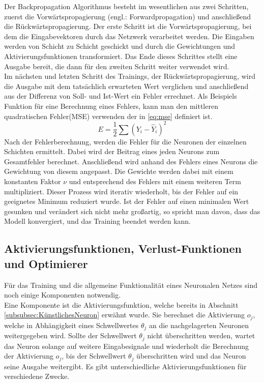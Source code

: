 Der Backpropagation Algorithmus besteht im wesentlichen aus zwei Schritten, zuerst die Vorwärtspropagierung (engl.: Forwardpropagation) und anschließend die Rückwärtspropagierung.
Der erste Schritt ist die Vorwärtspropagierung, bei dem die Eingabevektoren durch das Netzwerk verarbeitet werden. Die Eingaben werden von Schicht zu Schicht geschickt und durch die Gewichtungen und Aktivierungsfunktionen transformiert. Das Ende dieses Schrittes stellt eine Ausgabe bereit, die dann für den zweiten Schritt weiter verwendet wird. \\
Im nächsten und letzten Schritt des Trainings, der Rückwärtspropagierung, wird die Ausgabe mit dem tatsächlich erwarteten Wert verglichen und anschließend aus der Differenz von Soll- und Ist-Wert ein Fehler errechnet. Als Beispiels Funktion für eine Berechnung eines Fehlers, kann man den mittleren quadratischen Fehler(MSE) verwenden der in \ref{eq:mse} definiert ist.
\begin{equation}
	\label{eq:mse}
	E = \dfrac{1}{2} \sum (Y_i - \hat{Y}_{i})^2
\end{equation}
Nach der Fehlerberechnung, werden die Fehler für die Neuronen der einzelnen Schichten ermittelt. Dabei wird der Beitrag eines jeden Neurons zum Gesamtfehler berechnet. Anschließend wird anhand des Fehlers eines Neurons die Gewichtung von diesem angepasst. Die Gewichte werden dabei mit einem konstanten Faktor $\nu$ und entsprechend des Fehlers mit einem weiteren Term multipliziert. Dieser Prozess wird iterativ wiederholt, bis der Fehler auf ein geeignetes Minimum reduziert wurde. Ist der Fehler auf einen minimalen Wert gesunken und verändert sich nicht mehr großartig, so spricht man davon, dass das \gls{Modell} konvergiert, und das Training beendet werden kann.\cite[vgl.][]{Scherer1997}



\subsection{Aktivierungsfunktionen, Verlust-Funktionen und Optimierer}
\label{subsec:AktivierungsfunktionenVerlust-FunktionenOptimierer}
Für das Training und die allgemeine Funktionalität eines Neuronalen Netzes sind noch einige Komponenten notwendig.\\
Eine Komponente ist die Aktivierungsfunktion, welche bereits in Abschnitt \ref{subsubsec:KünstlichesNeuron} erwähnt wurde. Sie berechnet die Aktivierung $o_j$, welche in Abhängigkeit eines Schwellwertes $\theta_j$ an die nachgelagerten Neuronen weitergegeben wird. Sollte der Schwellwert $\theta_j$ nicht überschritten werden, wartet das Neuron solange auf weitere Eingabesignale und wiederholt die Berechnung der Aktivierung $o_j$, bis der Schwellwert $\theta_j$ überschritten wird und das Neuron seine Ausgabe weitergibt. Es gibt unterschiedliche Aktivierungsfunktionen für verschiedene Zwecke.

